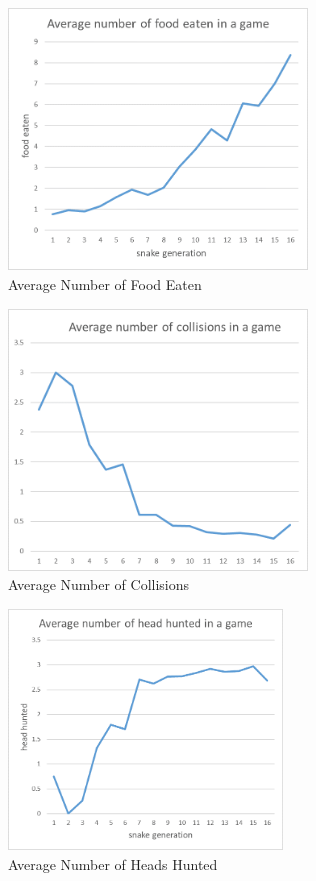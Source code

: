 \documentclass{article}
\begin{document}
\begin{figure}[!ht]
  \centering
  \includegraphics[width=300px]{food_eaten}
  \caption{Average Number of Food Eaten}
  \label{fig:food_eaten}
\end{figure}
\FloatBarrier

\begin{figure}[!ht]
  \centering
  \includegraphics[width=300px]{collisions}
  \caption{Average Number of Collisions}
  \label{fig:collisions}
\end{figure}
\FloatBarrier

\begin{figure}[!ht]
  \centering
  \includegraphics[width=275px]{heads_hunted}
  \caption{Average Number of Heads Hunted}
  \label{fig:heads_hunted}
\end{figure}
\FloatBarrier
\end{document}
